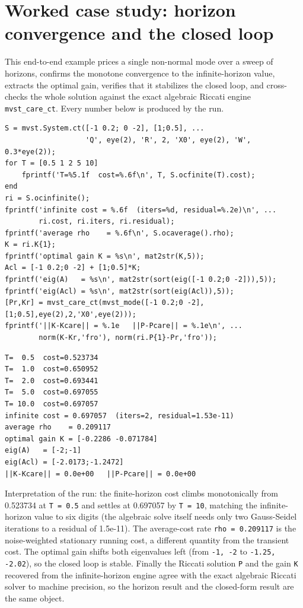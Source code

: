 \documentclass[11pt,oneside]{report}
\newcommand{\code}[1]{\texttt{#1}}
\begin{document}
\hypertarget{worked-case-study-horizon-convergence-and-the-closed-loop}{%
\section{Worked case study: horizon convergence and the closed loop}\label{worked-case-study-horizon-convergence-and-the-closed-loop}}

This end-to-end example prices a single non-normal mode over a sweep of
horizons, confirms the monotone convergence to the infinite-horizon value,
extracts the optimal gain, verifies that it stabilizes the closed loop, and
cross-checks the whole solution against the exact algebraic Riccati engine
\code{mvst\_care\_ct}. Every number below is produced by the run.

\begin{lstlisting}[style=matlabstyle]
S = mvst.System.ct([-1 0.2; 0 -2], [1;0.5], ...
                   'Q', eye(2), 'R', 2, 'X0', eye(2), 'W', 0.3*eye(2));
for T = [0.5 1 2 5 10]
    fprintf('T=%5.1f  cost=%.6f\n', T, S.ocfinite(T).cost);
end
ri = S.ocinfinite();
fprintf('infinite cost = %.6f  (iters=%d, residual=%.2e)\n', ...
        ri.cost, ri.iters, ri.residual);
fprintf('average rho    = %.6f\n', S.ocaverage().rho);
K = ri.K{1};
fprintf('optimal gain K = %s\n', mat2str(K,5));
Acl = [-1 0.2;0 -2] + [1;0.5]*K;
fprintf('eig(A)   = %s\n', mat2str(sort(eig([-1 0.2;0 -2])),5));
fprintf('eig(Acl) = %s\n', mat2str(sort(eig(Acl)),5));
[Pr,Kr] = mvst_care_ct(mvst_mode([-1 0.2;0 -2],[1;0.5],eye(2),2,'X0',eye(2)));
fprintf('||K-Kcare|| = %.1e   ||P-Pcare|| = %.1e\n', ...
        norm(K-Kr,'fro'), norm(ri.P{1}-Pr,'fro'));
\end{lstlisting}

\begin{lstlisting}[style=outputstyle]
T=  0.5  cost=0.523734
T=  1.0  cost=0.650952
T=  2.0  cost=0.693441
T=  5.0  cost=0.697055
T= 10.0  cost=0.697057
infinite cost = 0.697057  (iters=2, residual=1.53e-11)
average rho    = 0.209117
optimal gain K = [-0.2286 -0.071784]
eig(A)   = [-2;-1]
eig(Acl) = [-2.0173;-1.2472]
||K-Kcare|| = 0.0e+00   ||P-Pcare|| = 0.0e+00
\end{lstlisting}

Interpretation of the run: the finite-horizon cost climbs monotonically from 0.523734 at
\code{T = 0.5} and settles at 0.697057 by \code{T = 10}, matching the infinite-horizon
value to six digits (the algebraic solve itself needs only two Gauss-Seidel
iterations to a residual of 1.5e-11). The average-cost rate \code{rho = 0.209117} is
the noise-weighted stationary running cost, a different quantity from the
transient cost. The optimal gain shifts both eigenvalues left (from \code{-1, -2} to
\code{-1.25, -2.02}), so the closed loop is stable. Finally the Riccati solution \code{P}
and the gain \code{K} recovered from the infinite-horizon engine agree with the
exact algebraic Riccati solver to machine precision, so the horizon result and
the closed-form result are the same object.
\end{document}
